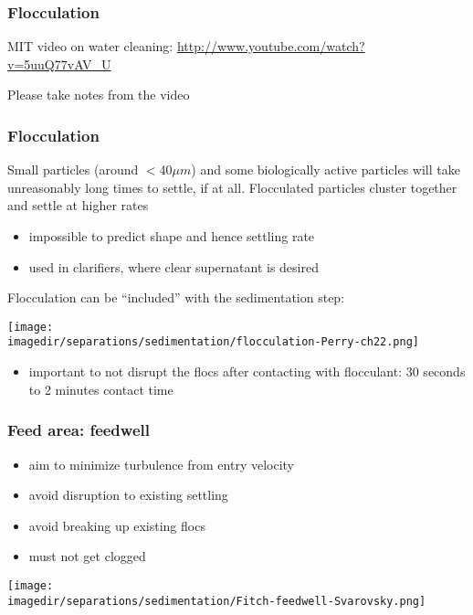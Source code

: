 \begin{frame}\frametitle{Flocculation}
	MIT video on water cleaning: \href{http://www.youtube.com/watch?v=5uuQ77vAV\_U}{http://www.youtube.com/watch?v=5uuQ77vAV\_U}

	\vspace{7cm}
	{\tiny Please take notes from the video}
\end{frame}

\begin{frame}\frametitle{Flocculation}
	Small particles (around $< 40 \mu m$) and some biologically active particles will take unreasonably long times to settle, if at all.
	\vspace{12pt}
	Flocculated particles cluster together and settle at higher rates
	\begin{itemize}
		\item	impossible to predict shape and hence settling rate
		\item	used in clarifiers, where clear supernatant is desired
	\end{itemize}
	\vspace{12pt}
	Flocculation can be ``included'' with the sedimentation step:
	\begin{center}
		\texttt{[image: \\imagedir/separations/sedimentation/flocculation-Perry-ch22.png]}
	\end{center}
	\begin{itemize}
		\item	important to not disrupt the flocs after contacting with flocculant: 30 seconds to 2 minutes contact time
	\end{itemize}
\end{frame}

\begin{frame}\frametitle{Feed area: feedwell}
	\begin{itemize}
		\item	aim to minimize turbulence from entry velocity
		\item	avoid disruption to existing settling
		\item	avoid breaking up existing flocs
		\item	must not get clogged
	\end{itemize}

	\begin{center}
		\texttt{[image: \\imagedir/separations/sedimentation/Fitch-feedwell-Svarovsky.png]}
	\end{center}
\end{frame}

